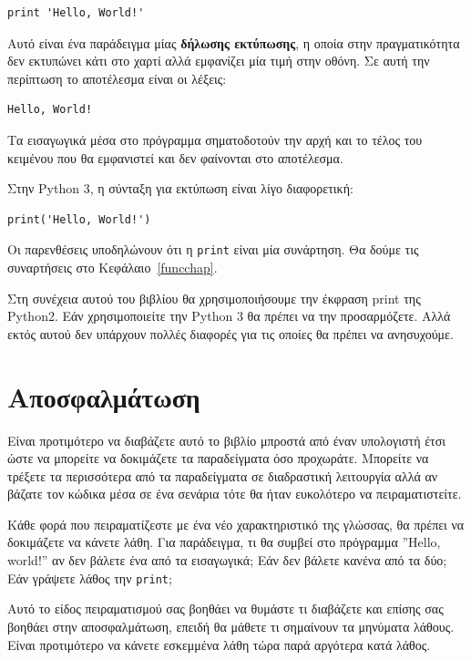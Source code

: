 \documentclass[10pt]{book}
\begin{document}
\begin{verbatim}
print 'Hello, World!'
\end{verbatim}
%

Αυτό είναι ένα παράδειγμα μίας {\bf δήλωσης εκτύπωσης}, η οποία
στην πραγματικότητα δεν εκτυπώνει κάτι στο χαρτί αλλά εμφανίζει μία
τιμή στην οθόνη. Σε αυτή την περίπτωση το αποτέλεσμα είναι οι λέξεις:

\begin{verbatim}
Hello, World!
\end{verbatim}
%

Τα εισαγωγικά μέσα στο πρόγραμμα σηματοδοτούν την αρχή και το τέλος
του κειμένου που θα εμφανιστεί και δεν φαίνονται στο αποτέλεσμα.


Στην Python 3, η σύνταξη για εκτύπωση είναι λίγο διαφορετική:

\begin{verbatim}
print('Hello, World!')
\end{verbatim}
%
Οι παρενθέσεις υποδηλώνουν ότι η {\tt print} είναι μία
συνάρτηση. Θα δούμε τις συναρτήσεις στο Κεφάλαιο~\ref{funcchap}.

  

Στη συνέχεια αυτού του βιβλίου θα χρησιμοποιήσουμε την έκφραση print της Python2.  
Εάν χρησιμοποιείτε την  Python 3  θα πρέπει να την προσαρμόζετε.  
Αλλά εκτός αυτού δεν υπάρχουν πολλές διαφορές για τις οποίες θα
πρέπει να ανησυχούμε.


\section{Αποσφαλμάτωση}
Είναι προτιμότερο να διαβάζετε αυτό το βιβλίο μπροστά από έναν υπολογιστή
έτσι ώστε να μπορείτε να δοκιμάζετε τα παραδείγματα όσο προχωράτε.  Μπορείτε
να τρέξετε τα περισσότερα από τα παραδείγματα σε διαδραστική λειτουργία αλλά αν 
βάζατε τον κώδικα μέσα σε ένα σενάρια τότε θα ήταν ευκολότερο να πειραματιστείτε.

Κάθε φορά που πειραματίζεστε με ένα νέο χαρακτηριστικό της γλώσσας, θα πρέπει να δοκιμάζετε
να κάνετε λάθη. Για παράδειγμα, τι θα συμβεί στο πρόγραμμα ''Hello, world!'' αν δεν βάλετε ένα από τα εισαγωγικά; Εάν δεν βάλετε κανένα από τα δύο; Εάν γράψετε λάθος την {\tt print};

Αυτό το είδος πειραματισμού σας βοηθάει να θυμάστε τι διαβάζετε και επίσης
σας βοηθάει στην αποσφαλμάτωση, επειδή θα μάθετε τι σημαίνουν τα μηνύματα
λάθους.  Είναι προτιμότερο να κάνετε εσκεμμένα λάθη τώρα παρά αργότερα κατά
λάθος.
\end{document}
